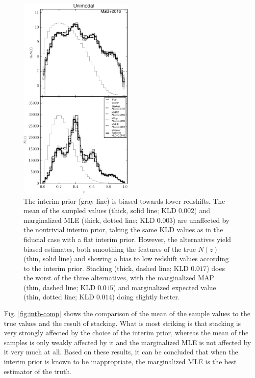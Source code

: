 \documentclass[preprint]{aastex}
\begin{document}
\begin{figure}
\includegraphics[width=0.5\textwidth]{figs/uint/comps.pdf}
\caption{The interim prior (gray line) is biased towards lower redshifts.  The 
mean of the sampled values (thick, solid line; KLD $0.002$) and marginalized 
MLE (thick, dotted line; KLD $0.003$) are unaffected by the nontrivial interim 
prior, taking the same KLD values as in the fiducial case with a flat interim 
prior.  However, the alternatives yield biased estimates, both smoothing the 
features of the true $N(z)$ (thin, solid line) and showing a bias to low 
redshift values according to the interim prior.  Stacking (thick, dashed line; 
KLD $0.017$) does the worst of the three alternatives, with the marginalized 
MAP (thin, dashed line; KLD $0.015$) and marginalized expected value (thin, 
dotted line; KLD $0.014$) doing slightly better.}
\label{fig:intu-comp}
\end{figure}


Fig. \ref{fig:intb-comp} shows the comparison of the mean of the sample values 
to the true values and the result of stacking.  What is most striking is that 
stacking is very strongly affected by the choice of the interim prior, whereas 
the mean of the samples is only weakly affected by it and the marginalized MLE 
is not affected by it very much at all.  Based on these results, it can be 
concluded that when the interim prior is known to be inappropriate, the 
marginalized MLE is the best estimator of the truth.  
\end{document}
